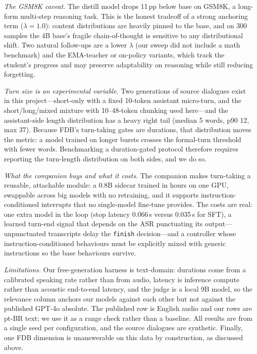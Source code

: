 \documentclass[conference]{IEEEtran}
\begin{document}
\emph{The GSM8K caveat.} The distill model drops 11\,pp below base on GSM8K, a
long-form multi-step reasoning task. This is the honest tradeoff of a strong
anchoring term ($\lambda{=}1.0$): content distributions are heavily pinned to the
base, and on 300 samples the 4B base's fragile chain-of-thought is sensitive to
any distributional shift. Two natural follow-ups are a lower $\lambda$ (our sweep
did not include a math benchmark) and the EMA-teacher or on-policy variants, which
track the student's progress and may preserve adaptability on reasoning while
still reducing forgetting.

\emph{Turn size is an experimental variable.} Two generations of source dialogues
exist in this project---short-only with a fixed 10-token assistant micro-turn, and
the short/long/mixed mixture with 10--48-token chunking used here---and the
assistant-side length distribution has a heavy right tail (median 5 words, p90 12,
max 37). Because FDB's turn-taking gates are durations, that distribution moves
the metric: a model trained on longer bursts crosses the formal-turn threshold
with fewer words. Benchmarking a duration-gated protocol therefore requires
reporting the turn-length distribution on both sides, and we do so.

\emph{What the companion buys and what it costs.} The companion makes turn-taking a
reusable, attachable module: a 0.8B sidecar trained in hours on one GPU, swappable
across big models with no retraining, and it supports instruction-conditioned
interrupts that no single-model fine-tune provides. The costs are real: one extra
model in the loop (stop latency 0.066\,s versus 0.035\,s for SFT), a learned
turn-end signal that depends on the ASR punctuating its output---unpunctuated
transcripts delay the \texttt{finish} decision---and a controller whose
instruction-conditioned behaviours must be explicitly mixed with generic
instructions so the base behaviours survive.

\emph{Limitations.} Our free-generation harness is text-domain: durations come from
a calibrated speaking rate rather than from audio, latency is inference compute
rather than acoustic end-to-end latency, and the judge is a local 9B model, so the
relevance column anchors our models against each other but not against the
published GPT-4o absolute. The published row is English audio and our rows are
pt-BR text; we use it as a range check rather than a baseline. All results are from
a single seed per configuration, and the source dialogues are synthetic. Finally,
one FDB dimension is unanswerable on this data by construction, as discussed above.
\end{document}
